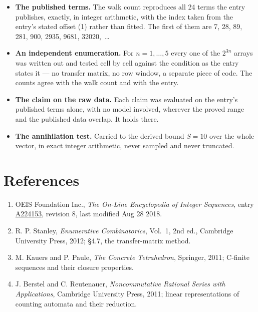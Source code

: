 \documentclass[11pt]{article}
\theoremstyle{definition}
\begin{document}
\begin{itemize}

\item {\bfseries The published terms.} The walk count reproduces all 24 terms the entry publishes, exactly, in integer arithmetic, with the index taken from the entry's stated offset (1) rather than fitted. The first of them are 7, 28, 89, 281, 900, 2935, 9681, 32020,~\dots

\item {\bfseries An independent enumeration.} For $n = 1,\dots,5$ every one of the $2^{3n}$ arrays was written out and tested cell by cell against the condition as the entry states it --- no transfer matrix, no row window, a separate piece of code. The counts agree with the walk count and with the entry.

\item {\bfseries The claim on the raw data.} Each claim was evaluated on the entry's published terms alone, with no model involved, wherever the proved range and the published data overlap. It holds there.

\item {\bfseries The annihilation test.} Carried to the derived bound $S = 10$ over the whole vector, in exact integer arithmetic, never sampled and never truncated.

\end{itemize}

\section{References}

\begin{enumerate}

\item OEIS Foundation Inc., \emph{The On-Line Encyclopedia of Integer Sequences}, entry \href{https://oeis.org/A224153}{A224153}, revision 8, last modified Aug 28 2018.

\item R. P. Stanley, \emph{Enumerative Combinatorics}, Vol.~1, 2nd ed., Cambridge University Press, 2012; \S4.7, the transfer-matrix method.

\item M. Kauers and P. Paule, \emph{The Concrete Tetrahedron}, Springer, 2011; C-finite sequences and their closure properties.

\item J. Berstel and C. Reutenauer, \emph{Noncommutative Rational Series with Applications}, Cambridge University Press, 2011; linear representations of counting automata and their reduction.

\end{enumerate}
\end{document}
